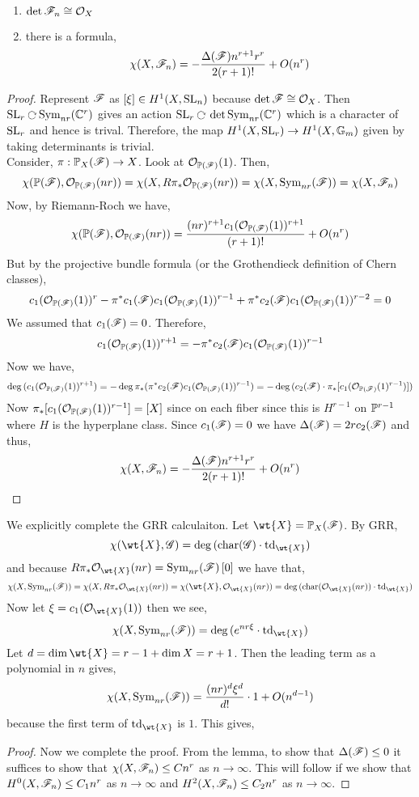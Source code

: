 \documentclass[12pt]{article}
\begin{document}
\begin{lemma}
\begin{enumerate}
\item $\det{\F_n} \cong \struct{X}$
\item there is a formula,
\[ \chi(X, \F_n) = - \frac{\Delta(\F) n^{r+1} r^{r}}{2 (r+1)!} + O(n^r) \]
\end{enumerate}
\end{lemma}

\begin{proof}
Represent $\F$ as $[\xi] \in H^1(X, \SL_n)$ because $\det{\F} \cong \struct{X}$. Then $\SL_{r} \acts \Sym{nr}{\CC^r}$ gives an action $\SL_r \acts \det{\Sym{nr}{\CC^r}}$ which is a character of $\SL_r$ and hence is trival. Therefore, the map $H^1(X, \SL_r) \to H^1(X, \Gm)$ given by taking determinants is trivial. 
\bigskip\\
Consider, $\pi : \P_X(\F) \to X$. Look at $\struct{\P(\F)}(1)$. Then,
\[ \chi(\P(\F), \struct{\P(\F)}(nr)) = \chi(X, R \pi_* \struct{\P(\F)}(nr)) = \chi(X, \Sym{nr}{\F}) = \chi(X, \F_n) \]
Now, by Riemann-Roch we have,
\[ \chi(\P(\F), \struct{\P(\F)}(nr)) = \frac{(nr)^{r+1} c_1(\struct{\P(\F)}(1))^{r+1}}{(r+1)!} + O(n^r) \]
But by the projective bundle formula (or the Grothendieck definition of Chern classes), 
\[ c_1(\struct{\P(\F)}(1))^{r} - \pi^* c_1(\F) c_1(\struct{\P(\F)}(1))^{r-1} + \pi^* c_2(\F) c_1(\struct{\P(\F)}(1))^{r-2} = 0 \]
We assumed that $c_1(\F) = 0$. Therefore, 
\[ c_1(\struct{\P(\F)}(1))^{r+1} = - \pi^* c_2(\F) c_1(\struct{\P(\F)}(1))^{r-1} \]
Now we have,
\[ \deg{(c_1(\struct{\P(\F)}(1))^{r+1})} = -\deg{\pi_*( \pi^* c_2(\F) c_1(\struct{\P(\F)}(1))^{r-1})} = - \deg{(c_2(\F) \cdot \pi_* [c_1(\struct{\P(\F)}(1)^{r-1})])} \]
Now $\pi_* [c_1(\struct{\P(\F)}(1))^{r-1}] = [X]$ since on each fiber since this is $H^{r-1}$ on $\P^{r-1}$ where $H$ is the hyperplane class. Since $c_1(\F) = 0$ we have $\Delta(\F) = 2 r c_2(\F)$ and thus,
\[ \chi(X, \F_n) = - \frac{\Delta(\F) n^{r+1} r^r}{2 (r+1) !} + O(n^r) \]
\end{proof}

\newcommand{\td}{\mathrm{td}}

\begin{rmk}
We explicitly complete the GRR calculaiton. Let $\wt{X} = \P_X(\F)$. By GRR,
\[ \chi(\wt{X}, \G) = \deg{(\ch(\G) \cdot \td_{\wt{X}})} \]
and because $R \pi_* \struct{\wt{X}}(nr) = \Sym{nr}{\F}[0]$ we have that,
\[ \chi(X, \Sym{nr}{\F}) = \chi(X, R \pi_* \struct{\wt{X}}(nr)) = \chi(\wt{X}, \struct{\wt{X}}(nr)) = \deg{(\ch(\struct{\wt{X}}(nr)) \cdot \td_{\wt{X}})} \]
Now let $\xi = c_1(\struct{\wt{X}}(1))$ then we see,
\[ \chi(X, \Sym{nr}{\F}) = \deg{(e^{nr \xi} \cdot \td_{\wt{X}})} \]
Let $d = \dim{\wt{X}} = r - 1 + \dim{X} = r + 1$. Then the leading term as a polynomial in $n$ gives,
\[ \chi(X, \Sym{nr}{\F}) = \frac{(nr)^d \xi^d}{d!} \cdot 1 + O(n^{d-1}) \]
because the first term of $\td_{\wt{X}}$ is $1$. This gives, 
\end{rmk}

\begin{proof}
Now we complete the proof. From the lemma, to show that $\Delta(\F) \le 0$ it suffices to show that $\chi(X, \F_n) \le C n^r$ as $n \to \infty$. This will follow if we show that $H^0(X, \F_n) \le C_1 n^r$ as $n \to \infty$ and $H^2(X, \F_n) \le C_2 n^r$ as $n \to \infty$. 
\end{proof}
\end{document}
